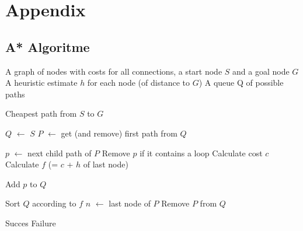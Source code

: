 \documentclass[alternative-exam.tex]{subfiles}
\newcommand{\algorithmicinput}{\textbf{Input:}}
\newcommand{\algorithmicoutput}{\textbf{Output:}}
\newcommand{\INPUT}{\item[\algorithmicinput]}
\newcommand{\OUTPUT}{\item[\algorithmicoutput]}
\newcommand{\algorithmicalgo}{\textbf{Algorithm:}}
\newcommand{\ALGO}{\item[\algorithmicalgo]}
\begin{document}
\appendix
\chapter*{Appendix}
\section{A* Algoritme}


\pagestyle{empty}
\begin{algorithmic}
\label{A*}
\INPUT
\STATE A graph of nodes with costs for all connections, a start node $S$ and a goal node $G$
\STATE A heuristic estimate $h$ for each node (of distance to $G$)
\STATE A queue Q of possible paths

\OUTPUT
\STATE Cheapest path from $S$ to $G$
\end{algorithmic}
\begin{algorithmic}
\ALGO
\STATE $Q$ $\leftarrow$ $S$
\STATE $P$ $\leftarrow$ get (and remove) first path from $Q$
\STATE \vspace{-0.5cm}

\STATE $p$ $\leftarrow$ next child path of $P$
\STATE Remove $p$ if it contains a loop
\STATE Calculate cost $c$
\STATE Calculate $f$ (= $c$ + $h$ of last node)

\STATE Add $p$ to $Q$
\ENDWHILE


\STATE Sort $Q$ according to $f$
\STATE $n$ $\leftarrow$ last node of $P$
\STATE Remove $P$ from $Q$
\ENDIF
\ENDFOR

\ENDWHILE
{}
\STATE Succes
\ELSE
\STATE Failure
\ENDIF
\end{algorithmic}
\end{document}
